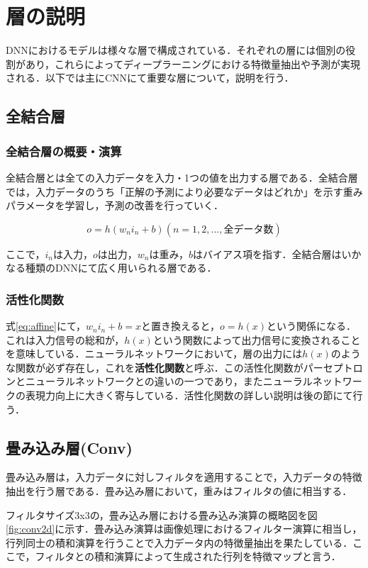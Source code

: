 \documentclass[a4j, 11pt]{jreport}
\begin{document}
\newpage
\section{層の説明}
DNNにおけるモデルは様々な層で構成されている．それぞれの層には個別の役割があり，これらによってディープラーニングにおける特徴量抽出や予測が実現される．以下では主にCNNにて重要な層について，説明を行う．
\subsection{全結合層}
\subsubsection{全結合層の概要・演算}
全結合層とは全ての入力データを入力・1つの値を出力する層である．全結合層では，入力データのうち「正解の予測により必要なデータはどれか」を示す重みパラメータを学習し，予測の改善を行っていく．

\begin{equation}
 o = h(w_n i_n + b)　(n = 1, 2, ... , 全データ数)
 \label{eq:affine}
\end{equation}

ここで，$i_n$は入力，$o$は出力，$w_n$は重み，$b$はバイアス項を指す．全結合層はいかなる種類のDNNにて広く用いられる層である．
\subsubsection{活性化関数}
式\ref{eq:affine}にて，$w_n i_n + b = x$と置き換えると，$o = h(x)$という関係になる．これは入力信号の総和が，$h(x)$という関数によって出力信号に変換されることを意味している．ニューラルネットワークにおいて，層の出力には$h(x)$のような関数が必ず存在し，これを\textbf{活性化関数}と呼ぶ．この活性化関数がパーセプトロンとニューラルネットワークとの違いの一つであり，またニューラルネットワークの表現力向上に大きく寄与している．活性化関数の詳しい説明は後の節にて行う．
\subsection{畳み込み層(Conv)}
畳み込み層は，入力データに対しフィルタを適用することで，入力データの特徴抽出を行う層である．畳み込み層において，重みはフィルタの値に相当する．

フィルタサイズ3x3の，畳み込み層における畳み込み演算の概略図を図\ref{fig:conv2d}に示す．畳み込み演算は画像処理におけるフィルター演算に相当し，行列同士の積和演算を行うことで入力データ内の特徴量抽出を果たしている．ここで，フィルタとの積和演算によって生成された行列を特徴マップと言う．
\end{document}
